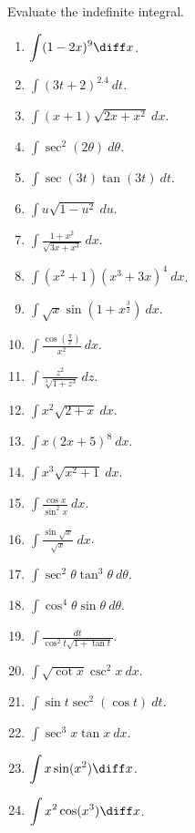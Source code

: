 Evaluate the indefinite integral.
\begin{multicols}{3}
\begin{enumerate}
\item $\displaystyle\int (1-2x)^9 \diff x $.
\item $\displaystyle\int (3t+2)^{2.4}~dt $.
\item $\displaystyle\int (x+1)\sqrt{2x+x^2} ~dx $.
\item $\displaystyle\int \sec^2(2\theta) ~d\theta $.
\item $\displaystyle\int \sec (3t) \tan (3t)~dt $.
\item $\displaystyle\int u\sqrt{1-u^2} ~du $.
\item $\displaystyle\int \frac{1+x^2}{\sqrt{3x+x^3}}~dx $.
\item $\displaystyle\int (x^2+1)(x^3+3x)^4 ~dx $.
\item $\displaystyle\int \sqrt{x}\sin (1+x^{\frac{3}{2}}) ~dx $.
\item $\displaystyle\int \frac{\cos\left(\frac{\pi}{x}\right)}{x^2} ~dx $.
\item $\displaystyle\int \frac{z^2}{\sqrt[3]{1+z^3}} ~dz $.
\item $\displaystyle\int x^2\sqrt{2+x}~dx $.
\item $\displaystyle\int x(2x+5)^8 ~dx $.
\item $\displaystyle\int x^3\sqrt{x^2+1} ~dx $.

\item $\displaystyle\int \frac{\cos x}{\sin^2 x} ~dx $.
\item $\displaystyle\int \frac{\sin \sqrt{x}}{\sqrt{x}} ~dx $.
\item $\displaystyle\int \sec^2\theta \tan^3\theta  ~d\theta $.
\item $\displaystyle\int \cos^4\theta\sin \theta ~d\theta $.
\item $\displaystyle\int \frac{dt}{\cos^2 t\sqrt{1+\tan t}} $.
\item $\displaystyle\int \sqrt{\cot x} \csc^2 x~dx $.
\item $\displaystyle\int \sin t \sec^2(\cos t)~dt $.
\item $\displaystyle\int \sec^3x \tan x~dx $.
\item $\displaystyle\int x \sin(x^2) \diff x $.
\item $\displaystyle\int x^2\cos(x^3)\diff x $.

\end{enumerate}
\end{multicols}

